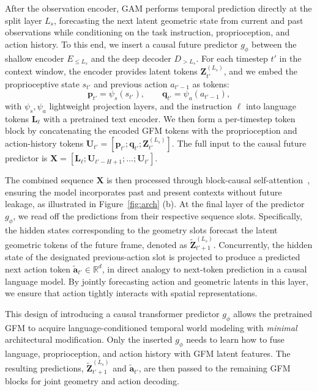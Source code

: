 \documentclass{llmxive}
\begin{document}
After the observation encoder, GAM performs temporal prediction directly at the split layer $L_s$, forecasting the next latent geometric state from current and past observations while conditioning on the task instruction, proprioception, and action history. To this end, we insert a causal future predictor $g_\phi$ between the shallow encoder $E_{\leq L_s}$ and the deep decoder $D_{>L_s}$.
For each timestep $t'$ in the context window, the encoder provides latent tokens $\mathbf{Z}_{t'}^{(L_s)}$, and we embed the proprioceptive state $s_{t'}$ and previous action $a_{t'-1}$ as tokens:
\begin{equation}
    \mathbf{p}_{t'} = \psi_s(s_{t'}), 
    \qquad
    \mathbf{q}_{t'} = \psi_a(a_{t'-1}),
\end{equation}
with $\psi_s, \psi_a$ lightweight projection layers, and the instruction $\ell$ into language tokens $\mathbf{L}_{\ell}$ with a pretrained text encoder. We then form a per-timestep token block by concatenating the encoded GFM tokens with the proprioception and action-history tokens $\mathbf{U}_{t'}=[\mathbf{p}_{t'};\mathbf{q}_{t'};\mathbf{Z}_{t'}^{(L_s)}]$. The full input to the causal future predictor is $\mathbf{X} = [\mathbf{L}_\ell; \mathbf{U}_{t'-H+1}; \ldots; \mathbf{U}_{t'}]$.

The combined sequence $\mathbf{X}$ is then processed through block-causal self-attention~\citep{wang2025pi}, ensuring the model incorporates past and present contexts without future leakage, as illustrated in Figure~\ref{fig:arch} (b). At the final layer of the predictor $g_\phi$, we read off the predictions from their respective sequence slots. Specifically, the hidden states corresponding to the geometry slots forecast the latent geometric tokens of the future frame, denoted as $\tilde{\mathbf{Z}}_{t'+1}^{(L_s)}$. Concurrently, the hidden state of the designated previous-action slot is projected to produce a predicted next action token $\tilde{\mathbf{a}}_{t'} \in \mathbb{R}^{d}$, in direct analogy to next-token prediction in a causal language model. By jointly forecasting action and geometric latents in this layer, we ensure that action tightly interacts with spatial representations.

This design of introducing a causal transformer predictor $g_\phi$ allows the pretrained GFM to acquire language-conditioned temporal world modeling with \textit{minimal} architectural modification. Only the inserted $g_\phi$ needs to learn how to fuse language, proprioception, and action history with GFM latent features. The resulting predictions, $\widetilde{\mathbf{Z}}_{t'+1}^{(L_s)}$ and $\tilde{\mathbf{a}}_{t'}$, are then passed to the remaining GFM blocks for joint geometry and action decoding.
\end{document}
